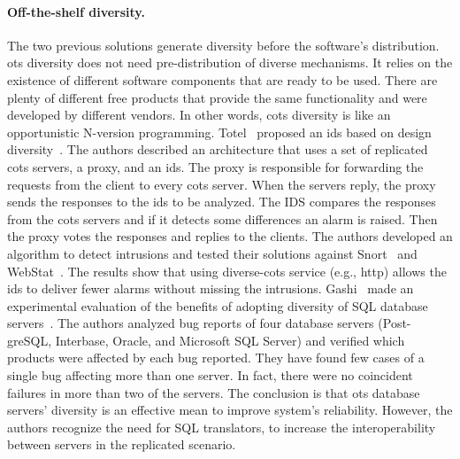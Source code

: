 \paragraph{Off-the-shelf diversity.}
The two previous solutions generate diversity before the software’s distribution. 
\gls{ots} diversity does not need pre-distribution of diverse mechanisms. 
It relies on the existence of different software components that are ready to be used.
There are plenty of different free products that provide the same functionality and were developed by different vendors. 
In other words, \gls{cots} diversity is like an opportunistic N-version programming.
Totel~\etal{} proposed an \gls{ids} based on design diversity~\cite{Totel:2005}.
The authors described an architecture that uses a set of replicated \gls{cots} servers, a proxy, and an \gls{ids}. 
The proxy is responsible for forwarding the requests from the client to every \gls{cots} server. 
When the servers reply, the proxy sends the responses to the \gls{ids} to be analyzed. 
The IDS compares the responses from the \gls{cots} servers and if it detects some differences an alarm is raised. 
Then the proxy votes the responses and replies to the clients. 
The authors developed an algorithm to detect intrusions and tested their solutions against Snort~\cite{snort} and WebStat~\cite{Vigna:2003}. 
The results show that using diverse-\gls{cots} service (e.g., http) allows the \gls{ids} to deliver fewer alarms without missing the intrusions.
Gashi~\etal{} made an experimental evaluation of the benefits of adopting diversity of SQL database servers~\cite{Gashi:2007}. 
The authors analyzed bug reports of four database servers (Post-greSQL, Interbase, Oracle, and Microsoft SQL Server) and verified which products were affected by each bug reported. 
They have found few cases of a single bug affecting more than one server. 
In fact, there were no coincident failures in more than two of the servers.
The conclusion is that \gls{ots} database servers’ diversity is an effective mean to improve system's reliability. 
However, the authors recognize the need for SQL translators, to increase the interoperability between servers in the replicated scenario.


